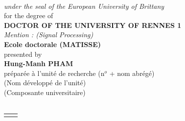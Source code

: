 \documentclass[10pt]{book}
\begin{document}
\begin{titlepage}
\begin{center}
\begin{minipage}{\glarg}
\vspace{0.5cm}
\\ \vspace{0mm}\emph{\Large under the seal of the European University of Brittany}\\ \vspace{0.5cm}
{\Large for the degree of}\\ \vspace{2mm}
{\Large\bf DOCTOR OF THE UNIVERSITY OF RENNES 1}\\ \vspace{0.4cm}
\emph{\Large Mention : (Signal Processing)}\\ \vspace{2mm}
{\Large\bf Ecole doctorale (MATISSE)}\\ \vspace{0.3cm}
{\Large presented by} \\ \vspace{3mm}
{\Huge\bf Hung-Manh PHAM}\\ \vspace{0.4cm}
{\Large pr\'epar\'ee \`a l'unit\'e de recherche (n$^o$ + nom abr\'eg\'e)\\
(Nom d\'evelopp\'e de l'unit\'e)\\
(Composante universitaire)}\vspace{0.3cm}
\\
\hspace{-20mm}{\rule{\Glarg}{1pt}}\\
\vspace{8mm}

\begin{tabular}{p{7cm}p{10cm}}
\begin{minipage}{\plarg}
\vspace{-4cm}
\hspace{-1.8cm}{\huge\bf Embedded Computing}\vspace{5mm}

\hspace{-1.8cm}{\huge\bf Architecture with }\vspace{5mm}

\hspace{-1.8cm}{\huge\bf Dynamic Hardware}\vspace{5mm}

\hspace{-1.8cm}{\huge\bf Reconfiguration for}\vspace{5mm}


\end{minipage}
\end{tabular}
\end{minipage}
\end{center}
\end{titlepage}
\end{document}
